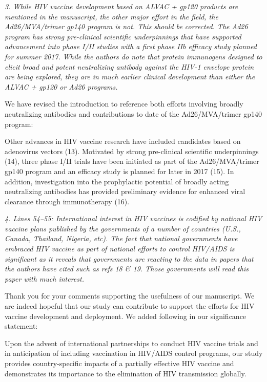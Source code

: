 \documentclass[12pt]{jpmletter}
\newenvironment{original}{\it}{}
\begin{document}
\begin{letter}{}
    \begin{original}
      3. While HIV vaccine development based on ALVAC + gp120 products
      are mentioned in the manuscript, the other major effort in the
      field, the Ad26/MVA/trimer gp140 program is not. This should be
      corrected. The Ad26 program has strong pre-clinical scientific
      underpinnings that have supported advancement into phase I/II
      studies with a first phase IIb efficacy study planned for summer
      2017. While the authors do note that protein immunogens designed
      to elicit broad and potent neutralizing antibody against the
      HIV-1 envelope protein are being explored, they are in much
      earlier clinical development than either the ALVAC + gp120 or
      Ad26 programs.
    \end{original}
    
    We have revised the introduction to reference both efforts
    involving broadly neutralizing antibodies and contributions to
    date of the Ad26/MVA/trimer gp140 program:
    \begin{quoting}
      Other advances in HIV vaccine research have included candidates
      based on adenovirus vectors (13). Motivated by strong
      pre-clinical scientific underpinnings (14), three phase I/II
      trials have been initiated as part of the Ad26/MVA/trimer gp140
      program and an efficacy study is planned for later in 2017
      (15). In addition, investigation into the prophylactic potential
      of broadly acting neutralizing antibodies has provided
      preliminary evidence for enhanced viral clearance through
      immunotherapy (16).
    \end{quoting}

    \begin{original}
      4. Lines 54–55: International interest in HIV vaccines is
      codified by national HIV vaccine plans published by the
      governments of a number of countries (U.S., Canada, Thailand,
      Nigeria, etc). The fact that national governments have embraced
      HIV vaccine as part of national efforts to control HIV/AIDS is
      significant as it reveals that governments are reacting to the
      data in papers that the authors have cited such as refs 18 \&
      19. Those governments will read this paper with much interest.
    \end{original}
    
    Thank you for your comments supporting the usefulness of our
    manuscript. We are indeed hopeful that our study can contribute to
    support the efforts for HIV vaccine development and deployment. We
    added following in our significance statement:
    \begin{quoting}
      Upon the advent of international partnerships to conduct HIV
      vaccine trials and in anticipation of including vaccination in
      HIV/AIDS control programs, our study provides country-specific
      impacts of a partially effective HIV vaccine and demonstrates
      its importance to the elimination of HIV transmission globally.
    \end{quoting}
    
  \end{letter}
\end{document}
